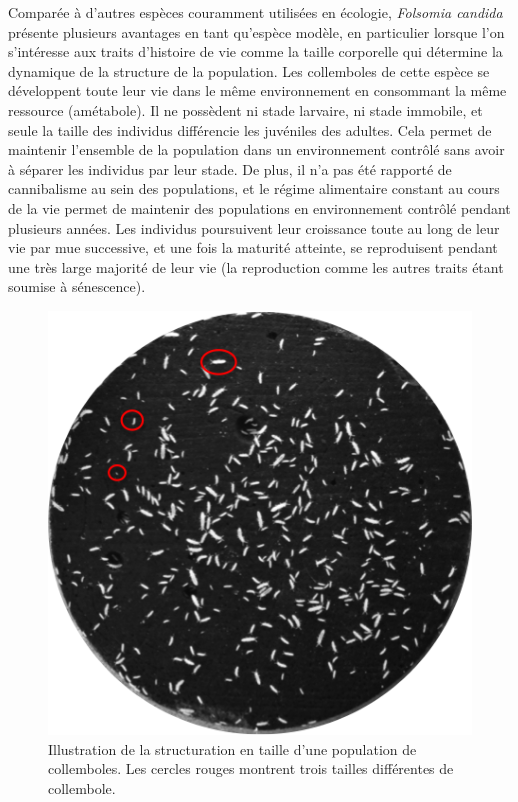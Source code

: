 Comparée à d'autres espèces couramment utilisées en écologie, \textit{Folsomia
candida} présente plusieurs avantages en tant qu'espèce modèle, en particulier
lorsque l'on s'intéresse aux traits d'histoire de vie comme la taille corporelle
qui détermine la dynamique de la structure de la population.
Les collemboles de cette espèce se développent toute leur vie dans le même
environnement en consommant la même ressource (amétabole). Il ne possèdent ni
stade larvaire, ni stade immobile, et seule la taille des individus différencie
les juvéniles des adultes. Cela permet de maintenir l'ensemble de la population
dans un environnement contrôlé sans avoir à séparer les individus par leur
stade. De plus, il n'a pas été rapporté de cannibalisme au sein des populations,
et le régime alimentaire constant au cours de la vie permet de maintenir des
populations en environnement contrôlé pendant plusieurs années. Les individus
poursuivent leur croissance toute au long de leur vie par mue successive, et une
fois la maturité atteinte, se reproduisent pendant une très large majorité de
leur vie (la reproduction comme les autres traits étant soumise à sénescence).

\begin{figure}[!ht]
\begin{center}
\includegraphics{1_CorpsDeThese/Methodo/StrucTaille}
\caption[ structuration en taille
d'une population de collemboles.]{Illustration de la structuration en taille
d'une population de collemboles. Les cercles rouges montrent trois tailles
différentes de collembole.}
\label{fig:strucpop}
\end{center}
\end{figure}

